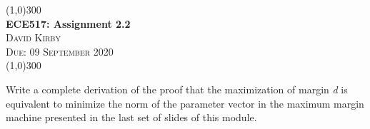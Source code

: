 \documentclass[11pt]{article}
\begin{document}
    \begin{center}
    \line(1,0){300}\\[0.25cm]
 	\Large{\bfseries ECE517: Assignment 2.2}\\
 	\textsc{\large David Kirby}\\
 	\textsc{\large Due: 09 September 2020}\\
 	\line(1,0){300}\\[0.75cm]
     \end{center}

\noindent Write a complete derivation of the proof that the maximization of margin \textit{d} is equivalent to minimize the norm of the parameter vector in the maximum margin machine presented in the last set of slides of this module.
\end{document}
